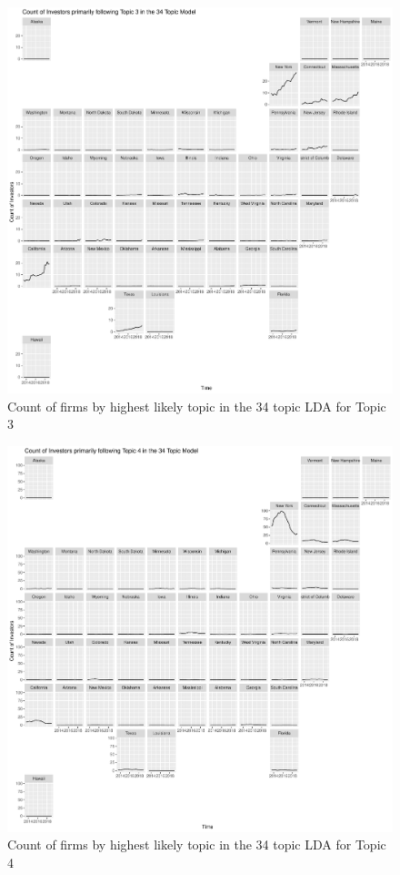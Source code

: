 		\begin{figure}
		\centering
		\includegraphics[width=1\linewidth]{Figures/ChapterV/USA_34_Topic03.pdf}
		\caption[Count of Firms for Topic 3 by Quarter]{Count of firms by highest likely topic in the 34 topic LDA for Topic 3}
		\label{fig:StateLDA3}
	\end{figure}
	
		\begin{figure}
		\centering
		\includegraphics[width=1\linewidth]{Figures/ChapterV/USA_34_Topic04.pdf}
		\caption[Count of Firms for Topic 4 by Quarter]{Count of firms by highest likely topic in the 34 topic LDA for Topic 4}
		\label{fig:StateLDA4}
	\end{figure}
	
